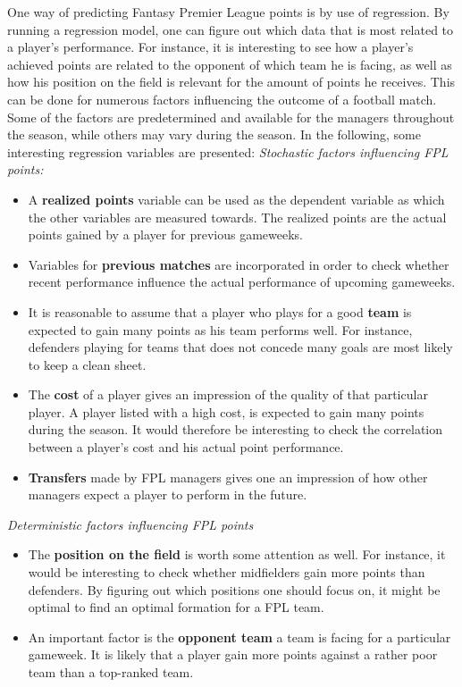 One way of predicting Fantasy Premier League points is by use of regression. By running a regression model, one can figure out which data that is most related to a player's performance. For instance, it is interesting to see how a player's achieved points are related to the opponent of which team he is facing, as well as how his position on the field is relevant for the amount of points he receives. This can be done for numerous factors influencing the outcome of a football match. Some of the factors are predetermined and available for the managers throughout the season, while others may vary during the season. In the following, some interesting regression variables are presented: 
\newpar
\textit{Stochastic factors influencing FPL points:}
\newpar
\begin{itemize}
    \item A \textbf{realized points} variable can be used as the dependent variable as which the other variables are measured towards. The realized points are the actual points gained by a player for previous gameweeks.
    \item Variables for \textbf{previous matches} are incorporated in order to check whether recent performance influence the actual performance of upcoming gameweeks.
    \item It is reasonable to assume that a player who plays for a good \textbf{team} is expected to gain many points as his team performs well. For instance, defenders playing for teams that does not concede many goals are most likely to keep a clean sheet.
    \item The \textbf{cost} of a player gives an impression of the quality of that particular player. A player listed with a high cost, is expected to gain many points during the season. It would therefore be interesting to check the correlation between a player's cost and his actual point performance. 
    \item \textbf{Transfers} made by FPL managers gives one an impression of how other managers expect a player to perform in the future.
    \end{itemize}
\newpar
\textit{Deterministic factors influencing FPL points}
\newpar
\begin{itemize}
    \item The \textbf{position on the field} is worth some attention as well. For instance, it would be interesting to check whether midfielders gain more points than defenders. By figuring out which positions one should focus on, it might be optimal to find an optimal formation for a FPL team.
    \item An important factor is the \textbf{opponent team} a team is facing for a particular gameweek. It is likely that a player gain more points against a rather poor team than a top-ranked team. 
\end{itemize}





